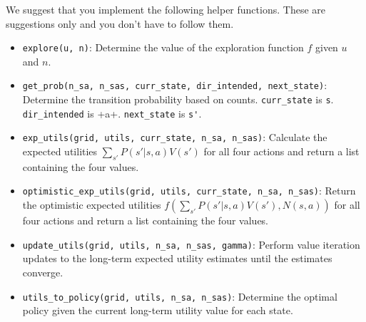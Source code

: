 \documentclass[12pt]{article}
\begin{document}
We suggest that you implement the following helper functions. These are suggestions only and you don't have to follow them.
\begin{itemize}

\item \verb+explore(u, n)+: Determine the value of the exploration function $f$ given $u$ and $n$.

\item \verb+get_prob(n_sa, n_sas, curr_state, dir_intended, next_state)+: Determine the transition probability based on counts. \verb+curr_state+ is \verb+s+. \verb+dir_intended+ is +a+.  \verb+next_state+ is \verb+s'+.

\item \verb+exp_utils(grid, utils, curr_state, n_sa, n_sas)+: Calculate the expected utilities $\displaystyle \sum_{s'} P(s' | s, a) V(s')$ for all four actions and return a list containing the four values.

\item \verb+optimistic_exp_utils(grid, utils, curr_state, n_sa, n_sas)+: Return the optimistic expected utilities $\displaystyle f \left(\sum_{s'} P(s' | s, a) V(s'), N(s,a) \right)$ for all four actions and return a list containing the four values.

\item \verb+update_utils(grid, utils, n_sa, n_sas, gamma)+: Perform value iteration updates to the long-term expected utility estimates until the estimates converge.

\item \verb+utils_to_policy(grid, utils, n_sa, n_sas)+: Determine the optimal policy given the current long-term utility value for each state. 


\end{itemize}
\end{document}
